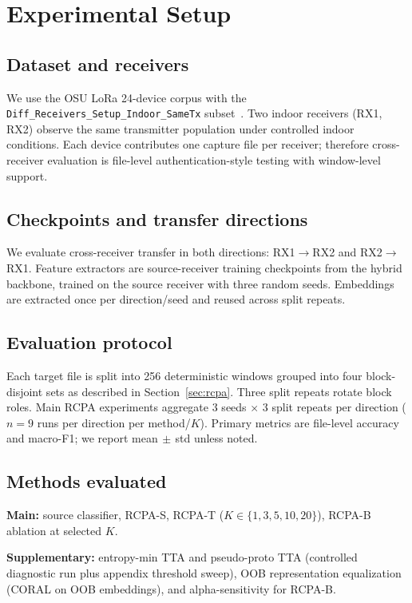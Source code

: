 \section{Experimental Setup}
\label{sec:experiments}

\subsection{Dataset and receivers}
We use the OSU LoRa 24-device corpus with the \texttt{Diff\_Receivers\_Setup\_Indoor\_SameTx} subset~\cite{elmaghbub2021lora_wild,hamdaoui2022deeplearning}.
Two indoor receivers (RX1, RX2) observe the same transmitter population under controlled indoor conditions.
Each device contributes one capture file per receiver; therefore cross-receiver evaluation is file-level authentication-style testing with window-level support.

\subsection{Checkpoints and transfer directions}
We evaluate cross-receiver transfer in both directions: RX1$\rightarrow$RX2 and RX2$\rightarrow$RX1.
Feature extractors are source-receiver training checkpoints from the hybrid backbone, trained on the source receiver with three random seeds.
Embeddings are extracted once per direction/seed and reused across split repeats.

\subsection{Evaluation protocol}
Each target file is split into 256 deterministic windows grouped into four block-disjoint sets as described in Section~\ref{sec:rcpa}.
Three split repeats rotate block roles.
Main RCPA experiments aggregate $3$ seeds $\times$ $3$ split repeats per direction ($n=9$ runs per direction per method/$K$).
Primary metrics are file-level accuracy and macro-F1; we report mean$\,\pm\,$std unless noted.

\subsection{Methods evaluated}
\textbf{Main:} source classifier, RCPA-S, RCPA-T ($K\in\{1,3,5,10,20\}$), RCPA-B ablation at selected $K$.

\textbf{Supplementary:} entropy-min TTA and pseudo-proto TTA (controlled diagnostic run plus appendix threshold sweep), OOB representation equalization (CORAL on OOB embeddings), and alpha-sensitivity for RCPA-B.

